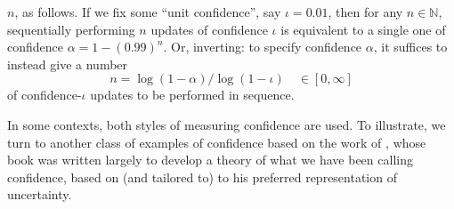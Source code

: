 $n$, as follows.
% 
%
%
If we fix some ``unit confidence'', say $\iota=0.01$,
then for any $n \in \mathbb N$,
sequentially performing $n$ updates of confidence $\iota$ is 
equivalent to a single one of confidence $\alpha= 1-(0.99)^n$.
Or, inverting:
to specify confidence $\alpha$, it suffices to 
instead give a number
\begin{equation} \label{eq:loglogiota}
 	n = \log (1 - \alpha ) / \log(1-\iota) 
	\quad\in[0,\infty]
\end{equation}
of confidence-$\iota$ updates to be performed in sequence.

In some contexts, both styles of measuring confidence are used. 
To illustrate, 
we turn to another class of examples of confidence
based on the work of 
\citeauthor{shafer1976mathematical},
whose 
\citeyear{shafer1976mathematical} book
was written largely 
to develop a theory of what we have been calling confidence,
based on (and tailored to) to his preferred representation of
uncertainty. 
%


